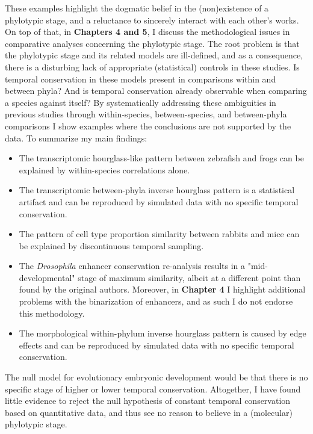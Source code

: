 These examples highlight the dogmatic belief in the (non)existence of a phylotypic stage, and a reluctance to sincerely interact with each other's works. On top of that, in \textbf{Chapters 4 and 5}, I discuss the methodological issues in comparative analyses concerning the phylotypic stage. The root problem is that the phylotypic stage and its related models are ill-defined, and as a consequence, there is a disturbing lack of appropriate (statistical) controls in these studies. Is temporal conservation in these models present in comparisons within and between phyla? And is temporal conservation already observable when comparing a species against itself? By systematically addressing these ambiguities in previous studies through within-species, between-species, and between-phyla comparisons I show examples where the conclusions are not supported by the data. To summarize my main findings:
\begin{itemize}
    \item The transcriptomic hourglass-like pattern between zebrafish and frogs\cite{marletaz2018} can be explained by within-species correlations alone.
    \item The transcriptomic between-phyla inverse hourglass pattern\cite{Levin2016} is a statistical artifact and can be reproduced by simulated data with no specific temporal conservation.
    \item The pattern of cell type proportion similarity between rabbits and mice\cite{Mayshar2023} can be explained by discontinuous temporal sampling.
    \item The \textit{Drosophila} enhancer conservation re-analysis results in a "mid-developmental" stage of maximum similarity, albeit at a different point than found by the original authors. Moreover, in \textbf{Chapter 4} I highlight additional problems with the binarization of enhancers, and as such I do not endorse this methodology.
    \item  The morphological within-phylum inverse hourglass pattern is caused by edge effects and can be reproduced by simulated data with no specific temporal conservation.
\end{itemize}
\noindent
The null model for evolutionary embryonic development would be that there is no specific stage of higher or lower temporal conservation. Altogether, I have found little evidence to reject the null hypothesis of constant temporal conservation based on quantitative data, and thus see no reason to believe in a (molecular) phylotypic stage.

